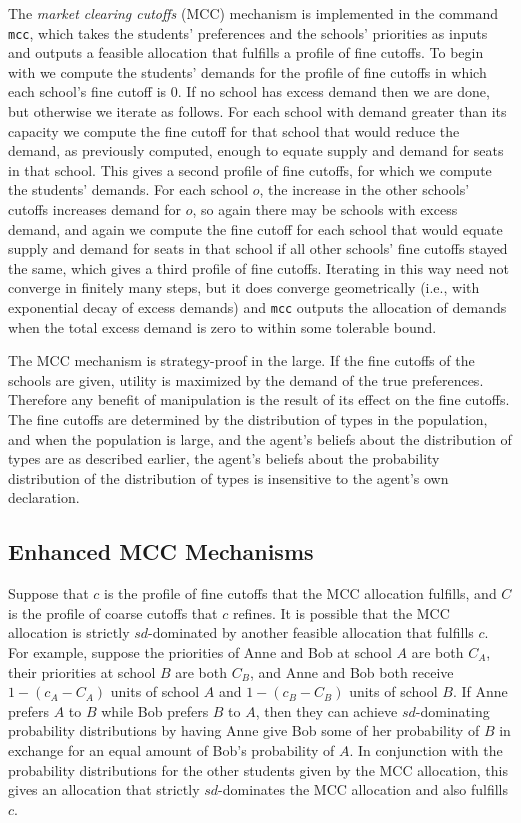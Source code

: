 \documentclass[12pt]{article}
\theoremstyle{definition}
\begin{document}
The \emph{market clearing cutoffs} (MCC) mechanism is implemented in
the command \texttt{mcc}, which takes the students' preferences and
the schools' priorities as inputs and outputs a feasible allocation
that fulfills a profile of fine cutoffs.  To begin with we compute the
students' demands for the profile of fine cutoffs in which each
school's fine cutoff is $0$.  If no school has excess demand then we
are done, but otherwise we iterate as follows.  For each school with
demand greater than its capacity we compute the fine cutoff for that
school that would reduce the demand, as previously computed, enough to
equate supply and demand for seats in that school.  This gives a
second profile of fine cutoffs, for which we compute the students'
demands.  For each school $o$, the increase in the other schools'
cutoffs increases demand for $o$, so again there may be schools with
excess demand, and again we compute the fine cutoff for each school
that would equate supply and demand for seats in that school if all
other schools' fine cutoffs stayed the same, which gives a third
profile of fine cutoffs.  Iterating in this way need not converge in
finitely many steps, but it does converge geometrically (i.e., with
exponential decay of excess demands) and \texttt{mcc} outputs the
allocation of demands when the total excess demand is zero to within
some tolerable bound.

The MCC mechanism is strategy-proof in the large.  If the fine cutoffs
of the schools are given, utility is maximized by the demand of the
true preferences.  Therefore any benefit of manipulation is the result
of its effect on the fine cutoffs.  The fine cutoffs are determined by
the distribution of types in the population, and when the population
is large, and the agent's beliefs about the distribution of types are
as described earlier, the agent's beliefs about the probability
distribution of the distribution of types is insensitive to the
agent's own declaration.  

\subsection{Enhanced MCC Mechanisms}

Suppose that $c$ is the profile of fine cutoffs that the MCC
allocation fulfills, and $C$ is the profile of coarse cutoffs that $c$
refines.  It is possible that the MCC allocation is strictly
$sd$-dominated by another feasible allocation that fulfills $c$.  For
example, suppose the priorities of Anne and Bob at school $A$ are both
$C_A$, their priorities at school $B$ are both $C_B$, and Anne and Bob
both receive $1 - (c_A - C_A)$ units of school $A$ and $1 - (c_B -
C_B)$ units of school $B$.  If Anne prefers $A$ to $B$ while Bob
prefers $B$ to $A$, then they can achieve $sd$-dominating probability
distributions by having Anne give Bob some of her probability of $B$
in exchange for an equal amount of Bob's probability of $A$.  In
conjunction with the probability distributions for the other students
given by the MCC allocation, this gives an allocation that strictly
$sd$-dominates the MCC allocation and also fulfills $c$.
\end{document}
